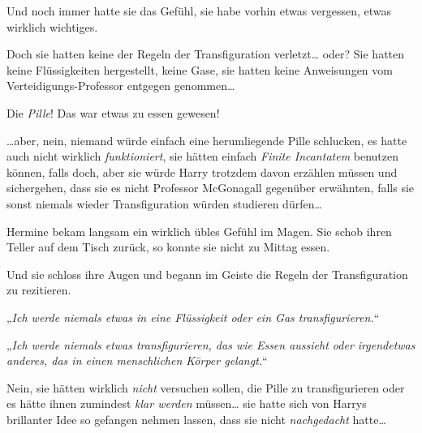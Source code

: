 Und noch immer hatte sie das Gefühl, sie habe vorhin etwas vergessen, etwas wirklich wichtiges.

Doch sie hatten keine der Regeln der Transfiguration verletzt… oder? Sie hatten keine Flüssigkeiten hergestellt, keine Gase, sie hatten keine Anweisungen vom Verteidigungs-Professor entgegen genommen…

Die \emph{Pille}! Das war etwas zu essen gewesen!

…aber, nein, niemand würde einfach eine herumliegende Pille schlucken, es hatte auch nicht wirklich \emph{funktioniert}, sie hätten einfach \emph{Finite Incantatem} benutzen können, falls doch, aber sie würde Harry trotzdem davon erzählen müssen und sichergehen, dass sie es nicht Professor McGonagall gegenüber erwähnten, falls sie sonst niemals wieder Transfiguration würden studieren dürfen…

Hermine bekam langsam ein wirklich übles Gefühl im Magen. Sie schob ihren Teller auf dem Tisch zurück, so konnte sie nicht zu Mittag essen.

Und sie schloss ihre Augen und begann im Geiste die Regeln der Transfiguration zu rezitieren.

„\emph{Ich werde niemals etwas in eine Flüssigkeit oder ein Gas transfigurieren.}“

„\emph{Ich werde niemals etwas transfigurieren, das wie Essen aussieht oder irgendetwas anderes, das in einen menschlichen Körper gelangt.}“

Nein, sie hätten wirklich \emph{nicht} versuchen sollen, die Pille zu transfigurieren oder es hätte ihnen zumindest \emph{klar werden} müssen… sie hatte sich von Harrys brillanter Idee so gefangen nehmen lassen, dass sie nicht \emph{nachgedacht} hatte…

